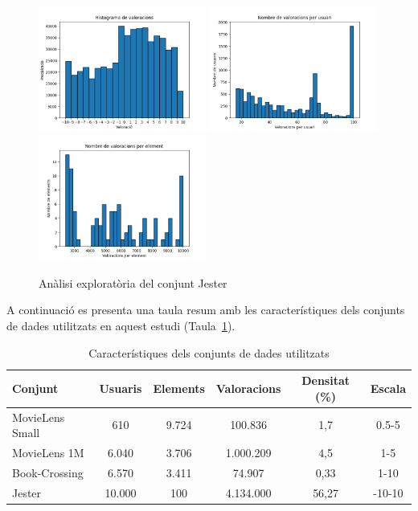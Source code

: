 \documentclass[a4paper,12pt]{report}
\begin{document}
\begin{figure}[H]
    \centering
    \includegraphics[width=0.49\textwidth]{Figuras/jester-ratings.png}
    \hfill
    \includegraphics[width=0.49\textwidth]{Figuras/jester-users.png}
    \hfill
    \includegraphics[width=0.49\textwidth]{Figuras/jester-items.png}
    \caption{Anàlisi exploratòria del conjunt Jester}
    \label{fig:analisis_jester}
\end{figure}

A continuació es presenta una taula resum amb les característiques dels conjunts de dades utilitzats en aquest estudi (Taula~\ref{tab:datasets}).

\begin{table}[H]
    \centering
    \begin{tabular}{|l|c|c|c|c|c|}
    \hline
    \textbf{Conjunt} & \textbf{Usuaris} & \textbf{Elements} & \textbf{Valoracions} & \textbf{Densitat (\%)} & \textbf{Escala} \\ \hline
    MovieLens Small & 610   & 9.724 & 100.836 & 1,7 & 0.5-5  \\ \hline
    MovieLens 1M         & 6.040 & 3.706 & 1.000.209 & 4,5 & 1-5   \\ \hline
    Book-Crossing        & 6.570 & 3.411 & 74.907   & 0,33 & 1-10 \\ \hline
    Jester               & 10.000& 100   & 4.134.000& 56,27 & -10-10 \\ \hline
    \end{tabular}
    \caption{Característiques dels conjunts de dades utilitzats}
    \label{tab:datasets}
\end{table}
\end{document}
